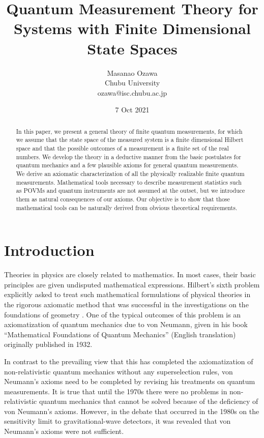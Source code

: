 \documentclass[12pt]{article}
\begin{document}
\date{7 Oct 2021}
\title{Quantum Measurement Theory for Systems with Finite Dimensional State Spaces}
\author{Masanao Ozawa \\ Chubu University  \\ {ozawa@isc.chubu.ac.jp}}

\maketitle
\begin{abstract}In this paper, we present a general theory of finite quantum measurements,
for which we assume that the state space of the measured system is a finite dimensional Hilbert space
and that the possible outcomes of a measurement is a finite set of the real numbers.
We develop the theory in a deductive manner from the basic postulates for quantum 
mechanics and a few plausible axioms for general quantum measurements.
We derive an axiomatic characterization of all the physically realizable
finite quantum measurements. 
Mathematical tools necessary to describe measurement statistics such as POVMs 
and quantum instruments are not assumed at the outset, but we introduce
them as natural consequences of our axioms.  Our objective is to show that those
mathematical tools can be naturally derived from obvious theoretical requirements.
\end{abstract}

\newpage

\section{Introduction}

Theories in physics are closely related to mathematics.
In most cases, their basic principles are given undisputed 
mathematical expressions.
Hilbert's sixth problem explicitly asked to treat such mathematical
formulations of physical theories in the rigorous axiomatic method
that was successful in the investigations on the foundations of geometry
\cite{Hil03}.
One of the typical outcomes of this problem is an axiomatization of 
quantum mechanics due to von Neumann, given in his
book ``Mathematical Foundations of Quantum Mechanics''  (English translation) \cite{vN32E}
originally published in 1932.

In contrast to the prevailing view that this has completed 
the axiomatization of non-relativistic quantum mechanics without
any superselection rules, von Neumann's axioms need to be
completed by revising his treatments on quantum measurements.
It is true that until the 1970s there were no problems in non-relativistic
quantum mechanics that cannot be solved because of the deficiency 
of von Neumann's axioms.
However, in the debate that occurred in the 1980s on the sensitivity limit 
to gravitational-wave detectors, it was revealed that 
von Neumann's axioms were not sufficient.
\end{document}
